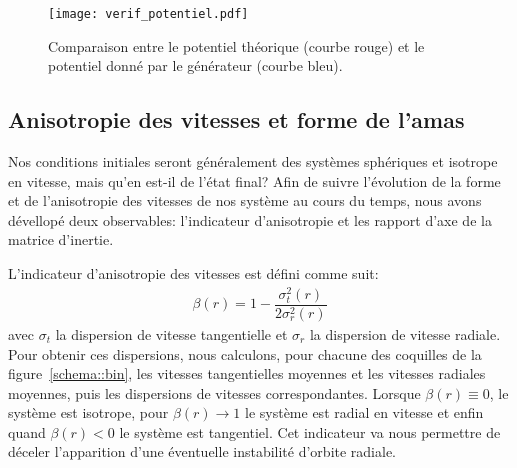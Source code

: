 

			\begin{figure}[h!]
				\centering \texttt{[image: verif\_potentiel.pdf]}
				\caption{Comparaison entre le potentiel théorique (courbe rouge) et le potentiel donné par le
					générateur (courbe bleu)\label{potentiel_5000}.}
			\end{figure}

		\subsection{Anisotropie des vitesses et forme de l'amas}

			Nos conditions initiales seront généralement des systèmes sphériques et isotrope en vitesse, mais
			qu'en est-il de l'état final?
			Afin de suivre l'évolution de la forme et de l'anisotropie des vitesses de nos système au cours
			du temps, nous avons dévellopé deux observables:
			l'indicateur d'anisotropie et les rapport d'axe de la matrice d'inertie.

			L'indicateur d'anisotropie des vitesses est défini comme suit:
			\begin{align}
				\beta(r) = 1 - \dfrac{\sigma_t^2(r)}{2\sigma_r^2(r)}
			\end{align}
			avec $\sigma_t$ la dispersion de vitesse tangentielle et $\sigma_r$ la dispersion de vitesse
			radiale. Pour obtenir ces dispersions, nous calculons, pour chacune des coquilles de la
			figure~\ref{schema::bin}, les vitesses tangentielles moyennes et les vitesses radiales moyennes,
			puis les dispersions de vitesses correspondantes.
			Lorsque $\beta(r) \equiv 0$, le système est isotrope, pour $\beta(r) \rightarrow 1$ le système
			est radial en vitesse et enfin quand $\beta(r) < 0$ le système est tangentiel.
			Cet indicateur va nous permettre de déceler l'apparition d'une éventuelle instabilité
			d'orbite radiale.

